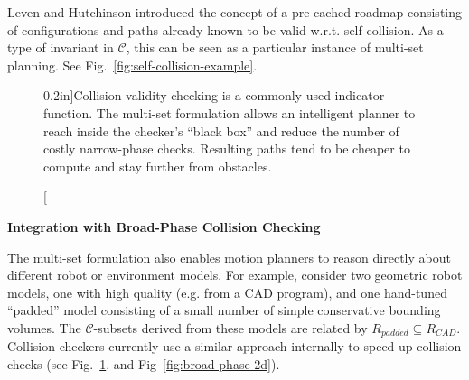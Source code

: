 Leven and Hutchinson \citep{leven2000changing}
introduced the concept of a pre-cached roadmap consisting of
configurations and paths already known to be valid w.r.t.
self-collision.
As a type of invariant in $\mathcal{C}$,
this can be seen as a particular instance of multi-set planning.
See Fig.~\ref{fig:self-collision-example}.

\begin{figure}[t]
   \centering
   
   \quad%
   
   \caption[][0.2in]{Collision validity checking is a commonly used
     indicator function.
     The multi-set formulation allows an intelligent planner to
     reach inside the checker's ``black box'' and reduce the number
     of costly narrow-phase checks.
     Resulting paths tend to be cheaper to compute and
     stay further from obstacles.}
   \label{fig:broad-phase}
\end{figure}

\vspace{0.1in}
\noindent
\textbf{Integration with Broad-Phase Collision Checking}
\label{subsec:broad-phase}

The multi-set formulation also enables motion planners to
reason directly about different robot or environment models.
For example, consider two geometric robot models,
one with high quality (e.g. from a CAD program),
and one hand-tuned ``padded'' model consisting of 
a small number of simple conservative bounding volumes.
The $\mathcal{C}$-subsets derived from these models
are related by $R_{padded} \subseteq R_{CAD}$.
Collision checkers currently use a similar approach internally
to speed up collision checks (see Fig.~\ref{fig:broad-phase}.
and Fig~\ref{fig:broad-phase-2d}).

